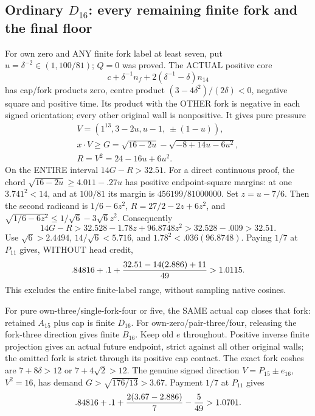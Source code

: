 \subsection{Ordinary \(D_{16}\): every remaining finite fork and the final floor}
\label{app:arithD16ordinaryfinish}

For own zero and ANY finite fork
label at least seven, put
\(u=\delta^{-2}\in(1,100/81)\);
\(Q=0\) was proved.
The ACTUAL positive core
\[
                     c+\delta^{-1}n_f+
                                     2(\delta^{-1}-\delta)n_{14}
\]
has cap/fork products zero, centre
product \((3-4\delta^2)/(2\delta)<0\),
negative square and positive time.
Its product with the OTHER fork is
negative in each signed orientation;
every other original wall is nonpositive.
It gives pure pressure
\[
 \begin{gathered}
 V=(1^{13},3-2u,u-1,\ \pm(1-u)),\\
 x\cdot V\ge G=\sqrt{16-2u}-\sqrt{-8+14u-6u^2},\\
                              R=V^2=24-16u+6u^2 .
 \end{gathered}
\]
On the ENTIRE interval \(14G-R>32.51\).
For a direct continuous proof, the chord
\(\sqrt{16-2u}\ge4.011-.27u\)
has positive endpoint-square margins:
at one \(3.741^2<14\), and at
\(100/81\) its margin is
\(456199/81000000\).
Set \(z=u-7/6\).
Then the second radicand is \(1/6-6z^2\),
\(R=27/2-2z+6z^2\), and
\(\sqrt{1/6-6z^2}\le1/\sqrt6-3\sqrt6z^2\).
Consequently
\[
 14G-R>32.528-1.78z+96.8748z^2
                     >32.528-.009>32.51 .
\]
Use \(\sqrt6>2.4494\), \(14/\sqrt6<5.716\),
and \(1.78^2<.036(96.8748)\).
Paying \(1/7\) at \(P_{11}\) gives,
WITHOUT head credit,
\[
              .84816+.1+{32.51-14(2.886)+11\over49}
                              >1.0115 .
\]
This excludes the entire finite-label
range, without sampling native cosines.

For pure own-three/single-fork-four
or five, the SAME actual cap closes
that fork: retained \(A_{15}\) plus
cap is finite \(D_{16}\).
For own-zero/pair-three/four, releasing
the fork-three direction gives finite
\(B_{16}\).
Keep old \(e\) throughout.
Positive inverse finite projection gives
an actual future endpoint, strict against
all other original walls; the omitted
fork is strict through its positive
cap contact.
The exact fork coshes are
\(7+8\delta>12\) or \(7+4\sqrt2>12\).
The genuine signed direction
\(V=P_{15}\pm e_{16}\), \(V^2=16\),
has demand \(G>\sqrt{176/13}>3.67\).
Payment \(1/7\) at \(P_{11}\) gives
\[
                  .84816+.1+{2(3.67-2.886)\over7}-{5\over49}>1.0701 .
\]

